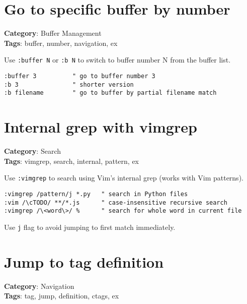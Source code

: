 {{{{{{\section{Go to specific buffer by number}

\textbf{Category}: Buffer Management\\ \textbf{Tags}: buffer, number, navigation, ex
\vspace{0.5cm}

Use {\footnotesize \Verb§:buffer N§} or {\footnotesize \Verb§:b N§} to switch to buffer number N from the buffer list.

\begin{Exa*}{}
\begin{Verbatim}[fontsize=\footnotesize, breaklines, breakanywhere]
:buffer 3          " go to buffer number 3
:b 3               " shorter version
:b filename        " go to buffer by partial filename match
\end{Verbatim}
\end{Exa*}

\section{Internal grep with vimgrep}

\textbf{Category}: Search\\ \textbf{Tags}: vimgrep, search, internal, pattern, ex
\vspace{0.5cm}

Use {\footnotesize \Verb§:vimgrep§} to search using Vim's internal grep (works with Vim patterns).

\begin{Exa*}{}
\begin{Verbatim}[fontsize=\footnotesize, breaklines, breakanywhere]
:vimgrep /pattern/j *.py   " search in Python files
:vim /\cTODO/ **/*.js      " case-insensitive recursive search
:vimgrep /\<word\>/ %      " search for whole word in current file
\end{Verbatim}
\end{Exa*}

Use {\footnotesize \Verb§j§} flag to avoid jumping to first match immediately.

\section{Jump to tag definition}

\textbf{Category}: Navigation\\ \textbf{Tags}: tag, jump, definition, ctags, ex
\vspace{0.5cm}

}}}}}}
